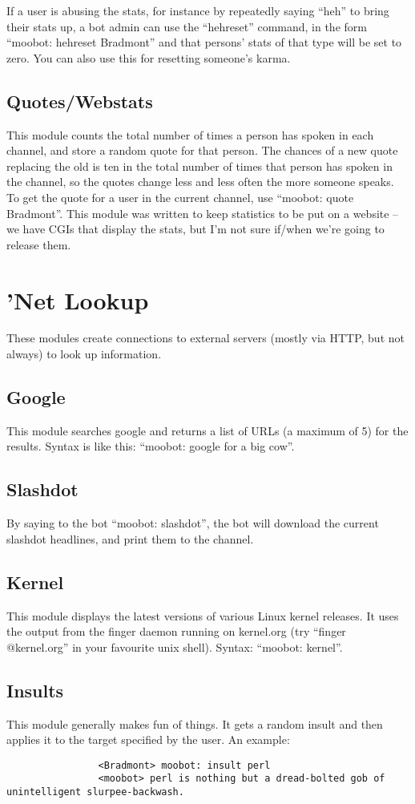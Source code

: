 \documentclass[titlepage]{article}
\begin{document}
			If a user is abusing the stats, for instance by repeatedly
			saying ``heh'' to bring their stats up, a bot admin can use
			the ``hehreset'' command, in the form ``moobot: hehreset 
			Bradmont'' and that persons' stats of that type will be set
			to zero.  You can also use this for resetting someone's
			karma.
			
		\subsection{Quotes/Webstats}
			This module counts the total number of times a person has
			spoken in each channel, and store a random quote for that
			person.  The chances of a new quote replacing the old is
			ten in the total number of times that person has spoken in
			the channel, so the quotes change less and less often the
			more someone speaks.  To get the quote for a user in the
			current channel, use ``moobot:  quote Bradmont''.  This
			module was written to keep statistics to be put on a
			website -- we have CGIs that display the stats, but I'm not
			sure if/when we're going to release them.

	\section{'Net Lookup}
		These modules create connections to external servers 
		(mostly via HTTP, but not always) to look up information.
		\subsection{Google}
			This module searches google and returns a list of URLs
			(a maximum of 5) for the results.  Syntax is like this:
			``moobot:  google for a big cow''.
		\subsection{Slashdot}
			By saying to the bot ``moobot: slashdot'', the bot will
			download the current slashdot headlines, and print them to
			the channel.
		\subsection{Kernel}
			This module displays the latest versions of various Linux
			kernel releases.  It uses the output from the finger daemon
			running on kernel.org (try ``finger @kernel.org'' in your
			favourite unix shell).  Syntax:  ``moobot: kernel''.
		\subsection{Insults}
			This module generally makes fun of things.  It gets a random
			insult and then applies it to the target specified by the
			user.  An example:
			\begin{verbatim}
				<Bradmont> moobot: insult perl
				<moobot> perl is nothing but a dread-bolted gob of unintelligent slurpee-backwash.
			\end{verbatim}
\end{document}
